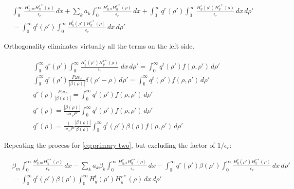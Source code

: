 \documentclass[11pt, oneside]{article}   	%
\begin{document}
\begin{align}
&\int_{0}^{\infty} \frac{H_{y,m}^{i} H_{y}^{r*}(\rho)}{\epsilon_{r}} \, dx
+ \sum_{k} a_{k} \int_{0}^{\infty}  \frac{H_{y,k}^{r} H_{y}^{r*}(\rho)}{\epsilon_{r}}\, dx 
+ \int_{0}^{\infty} q^{r} (\rho ') \int_{0}^{\infty} \frac{H_{y}^{r} (\rho ') H_{y}^{r*}(\rho)}{\epsilon_{r}} \, dx \, d\rho ' \nonumber \\
&= \int_{0}^{\infty} q^{t} (\rho ') \int_{0}^{\infty} \frac{H_{y}^{t} (\rho ') H_{y}^{r*}(\rho)}{\epsilon_{r}} \, dx \, d\rho '
\end{align}

\noindent Orthogonality eliminates virtually all the terms on the left side.

\begin{align}
\int_{0}^{\infty} q^{r}(\rho ') \int_{0}^{\infty} \frac{H_{y}^{r}(\rho ') H_{y}^{r*}(\rho)}{\epsilon_{r}} \; dx \, d\rho '= \int_{0}^{\infty} q^{t} (\rho ') f(\rho, \rho ') \, d\rho ' \nonumber \\
\int_{0}^{\infty} q^{r}(\rho ') \frac{P \omega \epsilon_{o}}{|\beta(\rho)|}\delta(\rho '-\rho) \, d\rho '
= \int_{0}^{\infty} q^{t} (\rho ') f(\rho, \rho ') \, d\rho ' \nonumber \\
q^{r}(\rho ) \frac{P \omega \epsilon_{o}}{|\beta(\rho)|} = \int_{0}^{\infty} q^{t} (\rho ') f(\rho, \rho ') \, d\rho ' \nonumber \\
q^{r}(\rho ) = \frac{|\beta(\rho)|}{\omega \epsilon_{o} P} \int_{0}^{\infty} q^{t} (\rho ') f(\rho, \rho ') \, d\rho ' \nonumber \\
q^{r}(\rho ) = \frac{1}{\omega \epsilon_{o} P} \frac{|\beta(\rho)|}{\beta(\rho)} \int_{0}^{\infty} q^{t} (\rho ') \beta(\rho) f(\rho, \rho ') \, d\rho '
\label{eq:qt-tm-1}
\end{align}

\noindent Repeating the process for \eqref{eq:primary-two}, but excluding the factor of $1/\epsilon_{r}$:

\begin{align}
&\beta_{m}\int_{0}^{\infty} \frac{H_{y,m}^{i} H_{y}^{r*}(\rho)}{\epsilon_{r}} \, dx
- \sum_{k} a_{k} \beta_{k} \int_{0}^{\infty}  \frac{H_{y,k}^{r} H_{y}^{r*}(\rho)}{\epsilon_{r}}\, dx 
- \int_{0}^{\infty} q^{r} (\rho ') \beta(\rho ')\int_{0}^{\infty} \frac{H_{y}^{r} (\rho ') H_{y}^{r*}(\rho)}{\epsilon_{r}} \, dx \, d\rho ' \nonumber \\
&= \int_{0}^{\infty} q^{t} (\rho ') \beta(\rho ')\int_{0}^{\infty} H_{y}^{t} (\rho ') H_{y}^{r*}(\rho) \, dx \, d\rho '
\end{align}
\end{document}
